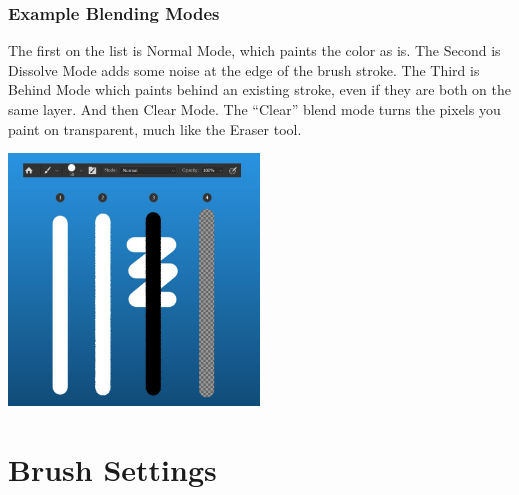 \documentclass{beamer}
\begin{document}
\begin{frame}
	\frametitle{Example Blending Modes}
	\begin{outline}
		\1 The first on the list is Normal Mode, which paints the color as is. 
		\1 The Second is Dissolve Mode adds some noise at the edge of the brush stroke.
		\1 The Third is Behind Mode which paints behind an existing stroke, even if they are both on the same layer.
		\1 And then Clear Mode. The “Clear” blend mode turns the pixels you paint on transparent, much like the Eraser tool.
	\end{outline}
	\begin{center}
		\includegraphics[width = 0.5\textwidth]{images/2.4.jpg}
	\end{center}
\end{frame}

\section{Brush Settings}	
\end{document}
